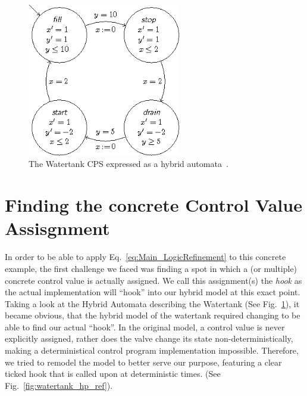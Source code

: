 \begin{figure}
	\centering
	\includegraphics[width=0.6\textwidth]{images/watertank_ha}
	\caption{The Watertank CPS expressed as a hybrid automata~\cite{keymaeraGuide}.}
	\label{fig:watertank_ha}
\end{figure}



\section{Finding the concrete Control Value Assisgnment}
\label{sec:Watertank:ControlValue}

In order to be able to apply Eq.~\ref{eq:Main_LogicRefinement} to this concrete example, the first challenge we faced was finding a spot in which a (or multiple) concrete control value is actually assigned. We call this assignment(s) the \textit{hook} as the actual implementation will ``hook'' into our hybrid model at this exact point. Taking a look at the Hybrid Automata describing the Watertank (See Fig.~\ref{fig:watertank_ha}), it became obvious, that the hybrid model of the watertank required changing to be able to find our actual ``hook''. In the original model, a control value is never explicitly assigned, rather does the valve change its state non-deterministically, making a deterministical control program implementation impossible. Therefore, we tried to remodel the model to better serve our purpose, featuring a clear ticked hook that is called upon at deterministic times. (See Fig.~\ref{fig:watertank_hp_ref}).

